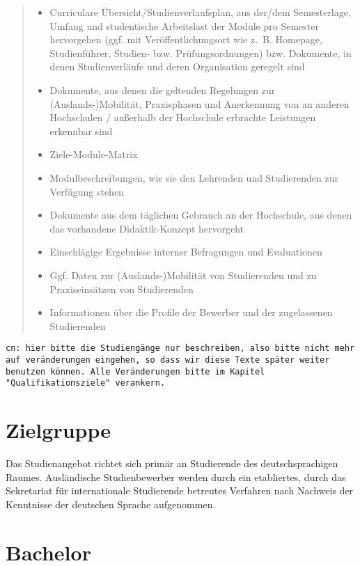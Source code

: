 \begin{quote}
\begin{itemize}
\item
  Curriculare Übersicht/Studienverlaufsplan, aus der/dem Semesterlage,
  Umfang und studentische Arbeitslast der Module pro Semester
  hervorgehen (ggf. mit Veröffentlichungsort wie z.~B. Homepage,
  Studienführer, Studien- bzw. Prüfungsordnungen) bzw. Dokumente, in
  denen Studienverläufe und deren Organisation geregelt sind
\item
  Dokumente, aus denen die geltenden Regelungen zur
  (Auslands-)Mobilität, Praxisphasen und Anerkennung von an anderen
  Hochschulen / außerhalb der Hochschule erbrachte Leistungen erkennbar
  sind
\item
  Ziele-Module-Matrix
\item
  Modulbeschreibungen, wie sie den Lehrenden und Studierenden zur
  Verfügung stehen
\item
  Dokumente aus dem täglichen Gebrauch an der Hochschule, aus denen das
  vorhandene Didaktik-Konzept hervorgeht
\item
  Einschlägige Ergebnisse interner Befragungen und Evaluationen
\item
  Ggf. Daten zur (Auslands-)Mobilität von Studierenden und zu
  Praxiseinsätzen von Studierenden
\item
  Informationen über die Profile der Bewerber und der zugelassenen
  Studierenden
\end{itemize}
\end{quote}

\begin{verbatim}
cn: hier bitte die Studiengänge nur beschreiben, also bitte nicht mehr auf veränderungen eingehen, so dass wir diese Texte später weiter benutzen können. Alle Veränderungen bitte im Kapitel "Qualifikationsziele" verankern.
\end{verbatim}

\section{Zielgruppe}\label{zielgruppe}

Das Studienangebot richtet sich primär an Studierende des
deutschsprachigen Raumes. Ausländische Studienbewerber werden durch ein
etabliertes, durch das Sekretariat für internationale Studierende
betreutes Verfahren nach Nachweis der Kenntnisse der deutschen Sprache
aufgenommen.

\section{Bachelor}\label{bachelor}

